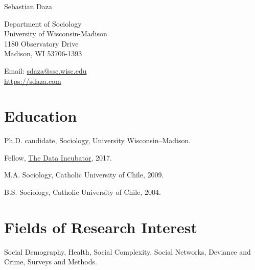 \documentclass[10pt,letterpaper]{article}
\def\name{Sebastian Daza}
\renewenvironment{itemize}{
  \begin{list}{}{
    \setlength{\leftmargin}{1.5em}
    \setlength{\itemsep}{0.25em}
    \setlength{\parskip}{0pt}
    \setlength{\parsep}{0.25em}
  }
}{
  \end{list}
}
\begin{document}

\centerline{\huge \name}

\bigskip
\bigskip

\begin{minipage}[t]{.75\textwidth}
  Department of Sociology \\
  University of Wisconsin-Madison \\
  1180 Observatory Drive \\
  Madison, WI 53706-1393 \\
\end{minipage}
\begin{minipage}[t]{0.3\textwidth}
  Email: \href{mailto:sdaza@ssc.wisc.edu}{sdaza@ssc.wisc.edu} \\
  \href{https://sdaza.com/}{https://sdaza.com} \\

\end{minipage}

\bigskip
\bigskip

\section*{Education}

\begin{itemize}
  \item Ph.D. candidate, Sociology, University Wisconsin--Madison.
  \item Fellow, \href{https://www.thedataincubator.com/fellowship.html}{The Data Incubator}, 2017.
  \item M.A. Sociology, Catholic University of Chile, 2009.
  \item B.S. Sociology, Catholic University of Chile, 2004.
\end{itemize}

\section*{Fields of Research Interest}

\begin{itemize}
\item Social Demography, Health, Social Complexity, Social Networks, Deviance and Crime, Surveys and Methods.
\end{itemize}
\end{document}
